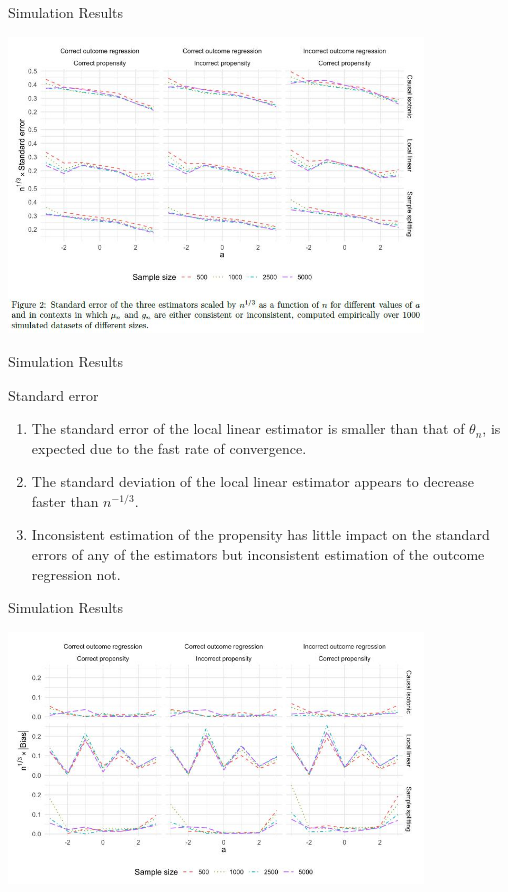 \documentclass{beamer}
\begin{document}
\begin{frame}{Simulation Results}

\includegraphics[width=11cm]{Causal Isotonic Regression/CIRS502}

\end{frame}


\begin{frame}{Simulation Results}

\begin{block}{Standard error}
	\begin{enumerate}
	\item	The standard error of the local linear estimator is smaller than that of $\theta_n$, is expected due to the fast rate of convergence.
	\item	The standard deviation of the local linear estimator appears to decrease faster than $n^{-1/3}$.
	\item	Inconsistent estimation of the propensity has little impact on the standard errors of any of the estimators but inconsistent estimation of the outcome regression not.
	\end{enumerate}
\end{block}

\end{frame}


\begin{frame}{Simulation Results}

\includegraphics[width=11cm]{Causal Isotonic Regression/CIRS503}

\end{frame}
\end{document}
